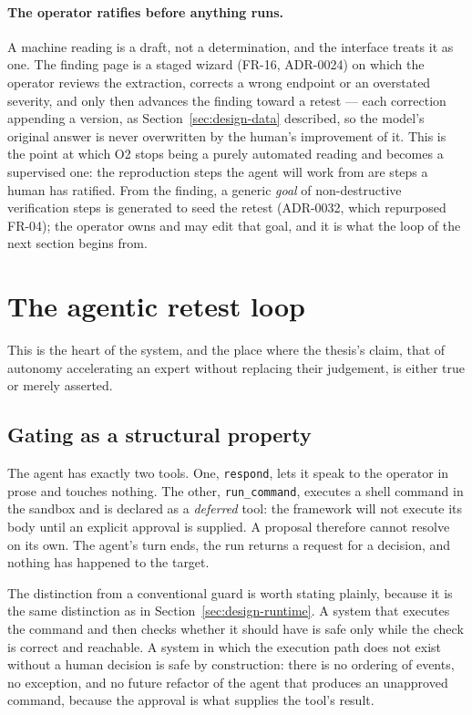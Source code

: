 \paragraph{The operator ratifies before anything runs.} A machine reading is a
draft, not a determination, and the interface treats it as one. The finding page is
a staged wizard (FR-16, ADR-0024) on which the operator reviews the extraction,
corrects a wrong endpoint or an overstated severity, and only then advances the
finding toward a retest --- each correction appending a version, as
Section~\ref{sec:design-data} described, so the model's original answer is never
overwritten by the human's improvement of it. This is the point at which O2 stops
being a purely automated reading and becomes a supervised one: the reproduction
steps the agent will work from are steps a human has ratified. From the finding, a
generic \emph{goal} of non-destructive verification steps is generated to seed the
retest (ADR-0032, which repurposed FR-04); the operator owns and may edit that
goal, and it is what the loop of the next section begins from.

\section{The agentic retest loop}
\label{sec:design-retest}

This is the heart of the system, and the place where the thesis's claim, that of
autonomy accelerating an expert without replacing their judgement, is
either true or merely asserted.

\subsection{Gating as a structural property}

The agent has exactly two tools. One, \texttt{respond}, lets it speak to the
operator in prose and touches nothing. The other, \texttt{run\_command},
executes a shell command in the sandbox and is declared as a \emph{deferred}
tool: the framework will not execute its body until an explicit approval is
supplied. A proposal therefore cannot resolve on its own. The agent's turn ends,
the run returns a request for a decision, and nothing has happened to the target.

The distinction from a conventional guard is worth stating plainly, because it is
the same distinction as in Section~\ref{sec:design-runtime}. A system that
executes the command and then checks whether it should have is safe only while
the check is correct and reachable. A system in which the execution path does not
exist without a human decision is safe by construction: there is no ordering
of events, no exception, and no future refactor of the agent that produces an
unapproved command, because the approval is what supplies the tool's result.

